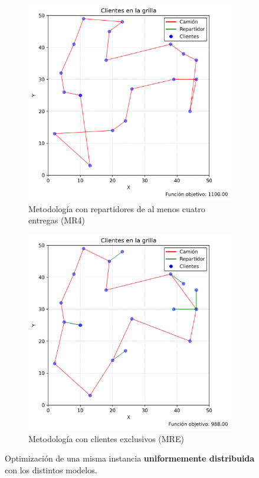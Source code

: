 \documentclass[10pt]{article}
\begin{document}
\begin{figure}[htbp]
	\vspace{0.5cm}
	
	\begin{subfigure}[b]{0.45\textwidth}
		\centering
		\includegraphics[width=\textwidth]{figuras/plano_uniforme_cuatro_o_mas_2.png}
		\caption{Metodología con repartidores de al menos cuatro entregas (MR4)}
		\label{fig:sub3}
	\end{subfigure}
	\hfill
	\begin{subfigure}[b]{0.45\textwidth}
		\centering
		\includegraphics[width=\textwidth]{figuras/plano_uniforme_exclusivos_2.png}
		\caption{Metodología con clientes exclusivos (MRE)}
		\label{fig:sub4}
	\end{subfigure}
	
	\caption{Optimización de una misma instancia \textbf{uniformemente distribuida} con los distintos modelos.}
	\label{fig:compuesta1}
\end{figure}
\end{document}
